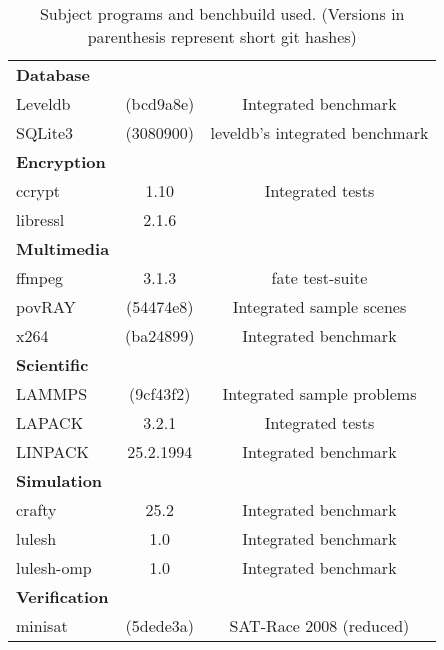 \begin{table}[H]
{\begin{minipage}{\textwidth}
\begin{tabularx}{\textwidth}{lcC}
                \midrule
                \textbf{Database}\\
                Leveldb & (bcd9a8e) & Integrated benchmark\\
                SQLite3 & (3080900) & leveldb's integrated benchmark\\
                \midrule
                \textbf{Encryption}\\
                ccrypt & 1.10 & Integrated tests\\
                libressl & 2.1.6\\
                \midrule
                \textbf{Multimedia}\\
                ffmpeg & 3.1.3 & fate test-suite\\
                povRAY & (54474e8) & Integrated sample scenes\\
                x264 & (ba24899) & Integrated benchmark\\
                \midrule
                \textbf{Scientific}\\
                LAMMPS & (9cf43f2) & Integrated sample problems\\
                LAPACK & 3.2.1 & Integrated tests\\
                LINPACK & 25.2.1994 & Integrated benchmark\\
                \midrule
                \textbf{Simulation}\\
                crafty & 25.2 & Integrated benchmark\\
                lulesh & 1.0 & Integrated benchmark\\
                lulesh-omp & 1.0 & Integrated benchmark\\
                \midrule
                \textbf{Verification}\\
                minisat & (5dede3a) & SAT-Race 2008 (reduced)\\
                \bottomrule
            \end{tabularx}
            \caption[Subject programs]{Subject programs and benchbuild used. (Versions in parenthesis represent short git hashes)}
            \label{tab:subjectPrograms}
        \end{minipage}
    }
\end{table}

